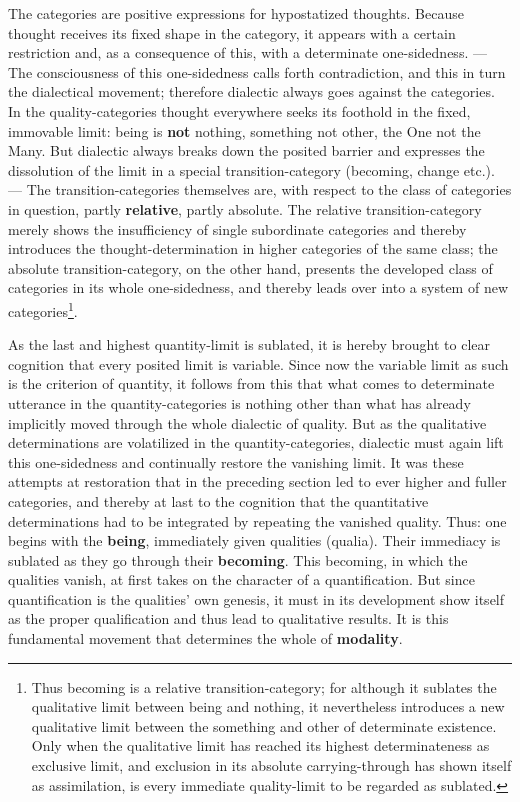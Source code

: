 \documentclass[12pt,a4paper,openany]{book}
\newcommand{\opage}[1]{\marginnote{\footnotesize\textit{[#1]}}}
\begin{document}
The categories are positive expressions for hypostatized thoughts. Because thought receives its fixed shape in the category, it appears with a certain restriction and, as a consequence of this, with a determinate one-sidedness. --- The consciousness of this one-sidedness calls forth contradiction, and this in turn the dialectical movement; therefore dialectic always goes against the categories.
\setcounter{footnote}{0}%
\opage{52}In the quality-categories thought everywhere seeks its foothold in the fixed, immovable limit: being is \textbf{not} nothing, something not other, the One not the Many. But dialectic always breaks down the posited barrier and expresses the dissolution of the limit in a special transition-category (becoming, change etc.). --- The transition-categories themselves are, with respect to the class of categories in question, partly \textbf{relative}, partly absolute. The relative transition-category merely shows the insufficiency of single subordinate categories and thereby introduces the thought-determination in higher categories of the same class; the absolute transition-category, on the other hand, presents the developed class of categories in its whole one-sidedness, and thereby leads over into a system of new categories\footnote{Thus becoming is a relative transition-category; for although it sublates the qualitative limit between being and nothing, it nevertheless introduces a new qualitative limit between the something and other of determinate existence. Only when the qualitative limit has reached its highest determinateness as exclusive limit, and exclusion in its absolute carrying-through has shown itself as assimilation, is every immediate quality-limit to be regarded as sublated.}.

As the last and highest quantity-limit is sublated, it is hereby brought to clear cognition that every posited limit is variable. Since now the variable limit as such is the criterion of quantity, it follows from this that what comes to determinate utterance in the quantity-categories is nothing other than what has already implicitly moved through the whole dialectic of quality. But as the qualitative determinations are volatilized in the quantity-categories, dialectic must again lift this one-sidedness and continually
\setcounter{footnote}{0}%
\opage{53}restore the vanishing limit. It was these attempts at restoration that in the preceding section led to ever higher and fuller categories, and thereby at last to the cognition that the quantitative determinations had to be integrated by repeating the vanished quality. Thus: one begins with the \textbf{being}, immediately given qualities (qualia). Their immediacy is sublated as they go through their \textbf{becoming}. This becoming, in which the qualities vanish, at first takes on the character of a quantification. But since quantification is the qualities' own genesis, it must in its development show itself as the proper qualification and thus lead to qualitative results. It is this fundamental movement that determines the whole of \textbf{modality}.
\end{document}
